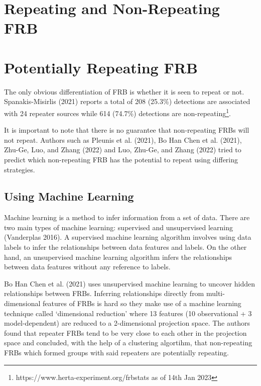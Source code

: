 \documentclass[
  letterpaper,
  DIV=11,
  numbers=noendperiod]{scrreport}
\begin{document}
\hypertarget{repeating-and-non-repeating-frb}{%
\section{Repeating and Non-Repeating
FRB}\label{repeating-and-non-repeating-frb}}

\hypertarget{potentially-repeating-frb}{%
\section{Potentially Repeating FRB}\label{potentially-repeating-frb}}

The only obvious differentiation of FRB is whether it is seen to repeat
or not. Spanakis-Misirlis (2021) reports a total of 208 (25.3\%)
detections are associated with 24 repeater sources while 614 (74.7\%)
detections are non-repeating\footnote{https://www.herta-experiment.org/frbstats
  as of 14th Jan 2023}.

It is important to note that there is no guarantee that non-repeating
FRBs will not repeat. Authors such as Pleunis et al. (2021), Bo Han Chen
et al. (2021), Zhu-Ge, Luo, and Zhang (2022) and Luo, Zhu-Ge, and Zhang
(2022) tried to predict which non-repeating FRB has the potential to
repeat using differing strategies.

\hypertarget{using-machine-learning}{%
\subsection{Using Machine Learning}\label{using-machine-learning}}

Machine learning is a method to infer information from a set of data.
There are two main types of machine learning: supervised and
unsupervised learning (Vanderplas 2016). A supervised machine learning
algorithm involves using data labels to infer the relationships between
data features and labels. On the other hand, an unsupervised machine
learning algorithm infers the relationships between data features
without any reference to labels.

Bo Han Chen et al. (2021) uses unsupervised machine learning to uncover
hidden relationships between FRBs. Inferring relationships directly from
multi-dimensional features of FRBs is hard so they make use of a machine
learning technique called `dimensional reduction' where 13 features (10
observational + 3 model-dependent) are reduced to a 2-dimensional
projection space. The authors found that repeater FRBs tend to be very
close to each other in the projection space and concluded, with the help
of a clustering algortihm, that non-repeating FRBs which formed groups
with said repeaters are potentially repeating.
\end{document}
